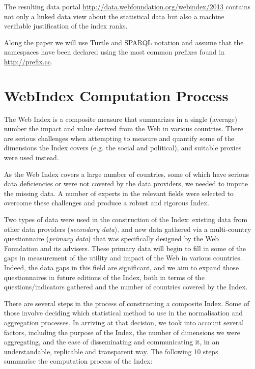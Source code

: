 \documentclass{acm_proc_article-sp}
\begin{document}
The resulting data portal \url{http://data.webfoundation.org/webindex/2013} contains not only a linked data view about
the statistical data but also a machine verifiable justification of the index ranks.


Along the paper we will use Turtle and SPARQL notation and assume that the
namespaces have been declared using the most common prefixes found in
\url{http://prefix.cc}.

\section{WebIndex Computation Process}

The Web Index is a composite measure that summarizes in a single (average) number the impact and value derived from the Web in various countries. There are serious challenges when attempting to measure and quantify some of the dimensions the Index covers (e.g. the social and political), and suitable proxies were used instead.

As the Web Index covers a large number of countries, some of which have serious data deficiencies or were not covered by the data providers, we needed to impute the missing data. 
A number of experts in the relevant fields were selected to overcome these challenges and 
produce a robust and rigorous Index.

Two types of data were used in the construction of the Index: existing data from other data providers (\emph{secondary data}), and new data gathered via a multi-country questionnaire (\emph{primary data}) 
that was specifically designed by the Web Foundation and its advisers. 
These primary data will begin to fill in some of the gaps in measurement of the utility and impact of the Web in various countries. 
Indeed, the data gaps in this field are significant, and we aim to expand those questionnaires in future editions of the Index, both in terms of the questions/indicators gathered and the number of countries covered by the Index.

There are several steps in the process of constructing a composite Index. Some of those involve deciding which statistical method to use in the normalisation and aggregation processes. In arriving at that decision, we took into account several factors, including the purpose of the Index, the number of dimensions we were
aggregating, and the ease of disseminating and communicating it, in an understandable, replicable and transparent way. The following 10 steps summarise the computation process of the Index:
\end{document}
